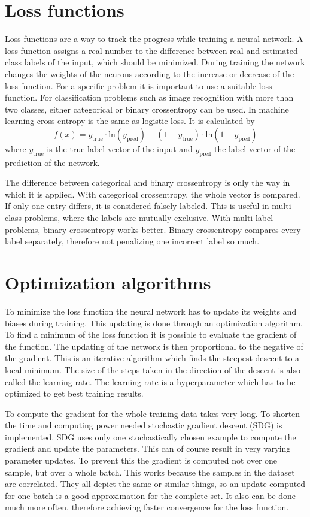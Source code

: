 \section{Loss functions}
Loss functions are a way to track the progress while training a neural network. A loss function assigns a real number to the difference between real and estimated class labels of the input, which should be minimized. During training the network changes the weights of the neurons according to the increase or decrease of the loss function. For a specific problem it is important to use a suitable loss function. For classification problems such as image recognition with more than two classes, either categorical or binary crossentropy can be used. In machine learning cross entropy is the same as logistic loss. It is calculated by
\begin{equation}
f(x) = y_{\mathrm{true}} \cdot \mathrm{ln} (y_{\mathrm{pred}}) + (1 - y_{\mathrm{true}}) \cdot \mathrm{ln} (1 - y_{\mathrm{pred}})
\end{equation}
where $y_{\mathrm{true}}$ is the true label vector of the input and $y_{\mathrm{pred}}$ the label vector of the prediction of the network.

The difference between categorical and binary crossentropy is only the way in which it is applied. With categorical crossentropy, the whole vector is compared. If only one entry differs, it is considered falsely labeled. This is useful in multi-class problems, where the labels are mutually exclusive. With multi-label problems, binary crossentropy works better. Binary crossentropy compares every label separately, therefore not penalizing one incorrect label so much. 

\section{Optimization algorithms}
To minimize the loss function the neural network has to update its weights and biases during training. This updating is done through an optimization algorithm. To find a minimum of the loss function it is possible to evaluate the gradient of the function. The updating of the network is then proportional to the negative of the gradient. This is an iterative algorithm which finds the steepest descent to a local minimum. The size of the steps taken in the direction of the descent is also called the learning rate. The learning rate is a hyperparameter which has to be optimized to get best training results. 

To compute the gradient for the whole training data takes very long. To shorten the time and computing power needed stochastic gradient descent (SDG) is implemented. SDG uses only one stochastically chosen example to compute the gradient and update the parameters. This can of course result in very varying parameter updates. To prevent this the gradient is computed not over one sample, but over a whole batch. This works because the samples in the dataset are correlated. They all depict the same or similar things, so an update computed for one batch is a good approximation for the complete set. It also can be done much more often, therefore achieving faster convergence for the loss function.

